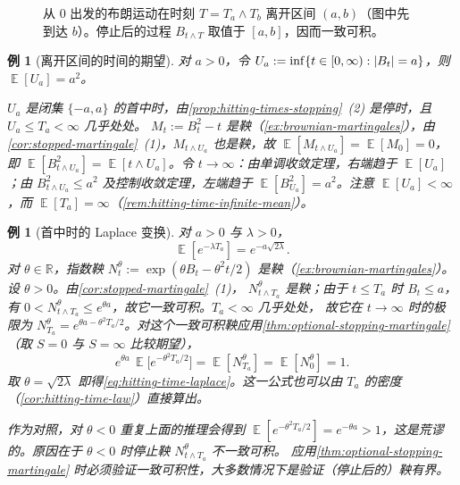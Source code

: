 \documentclass[UTF8,11pt,a4paper,oneside,fontset=fandol]{ctexrep}
\numberwithin{equation}{section}
\theoremstyle{zhthm}
\newtheorem{example}[theorem]{例}
\newcommand{\R}{\mathbb{R}}
\DeclareMathOperator{\E}{\mathbb{E}}
\DeclarePairedDelimiter{\abs}{\lvert}{\rvert}
\begin{document}
\begin{figure}[htbp]
  \caption{从 $0$ 出发的布朗运动在时刻 $T=T_a\wedge T_b$ 离开区间 $(a,b)$（图中先到达 $b$）。停止后的过程 $B_{t\wedge T}$ 取值于 $[a,b]$，因而一致可积。}
  \label{fig:exit-interval}
\end{figure}

\begin{example}[离开区间的时间的期望]
\label{ex:exit-time-mean}
对 $a>0$，令 $U_a:=\inf\{t\in[0,\infty):\abs{B_t}=a\}$，则 $\E[U_a]=a^2$。

$U_a$ 是闭集 $\{-a,a\}$ 的首中时，由\cref{prop:hitting-times-stopping}~(2) 是停时，且 $U_a\le T_a<\infty$ 几乎处处。
$M_t:=B_t^2-t$ 是鞅（\cref{ex:brownian-martingales}），由\cref{cor:stopped-martingale}~(1)，$M_{t\wedge U_a}$ 也是鞅，故 $\E[M_{t\wedge U_a}]=\E[M_0]=0$，即
$\E[B_{t\wedge U_a}^2]=\E[t\wedge U_a]$。令 $t\to\infty$：由单调收敛定理，右端趋于 $\E[U_a]$；由 $B_{t\wedge U_a}^2\le a^2$ 及控制收敛定理，左端趋于
$\E[B_{U_a}^2]=a^2$。注意 $\E[U_a]<\infty$，而 $\E[T_a]=\infty$（\cref{rem:hitting-time-infinite-mean}）。
\end{example}

\begin{example}[首中时的 Laplace 变换]
\label{ex:hitting-time-laplace}
对 $a>0$ 与 $\lambda>0$，
\begin{equation}
  \label{eq:hitting-time-laplace}
  \E[e^{-\lambda T_a}]=e^{-a\sqrt{2\lambda}}.
\end{equation}
对 $\theta\in\R$，指数鞅 $N^\theta_t:=\exp(\theta B_t-\theta^2t/2)$ 是鞅（\cref{ex:brownian-martingales}）。设 $\theta>0$。由\cref{cor:stopped-martingale}~(1)，
$N^\theta_{t\wedge T_a}$ 是鞅；由于 $t\le T_a$ 时 $B_t\le a$，有 $0<N^\theta_{t\wedge T_a}\le e^{\theta a}$，故它一致可积。$T_a<\infty$ 几乎处处，
故它在 $t\to\infty$ 时的极限为 $N^\theta_{T_a}=e^{\theta a-\theta^2T_a/2}$。对这个一致可积鞅应用\cref{thm:optional-stopping-martingale}（取 $S=0$ 与 $S=\infty$ 比较期望），
\[
  e^{\theta a}\,\E\bigl[e^{-\theta^2T_a/2}\bigr]=\E[N^\theta_{T_a}]=\E[N^\theta_0]=1.
\]
取 $\theta=\sqrt{2\lambda}$ 即得\cref{eq:hitting-time-laplace}。这一公式也可以由 $T_a$ 的密度（\cref{cor:hitting-time-law}）直接算出。

作为对照，对 $\theta<0$ 重复上面的推理会得到 $\E[e^{-\theta^2T_a/2}]=e^{-\theta a}>1$，这是荒谬的。原因在于 $\theta<0$ 时停止鞅 $N^\theta_{t\wedge T_a}$ 不一致可积。
应用\cref{thm:optional-stopping-martingale} 时必须验证一致可积性，大多数情况下是验证（停止后的）鞅有界。
\end{example}
\end{document}
